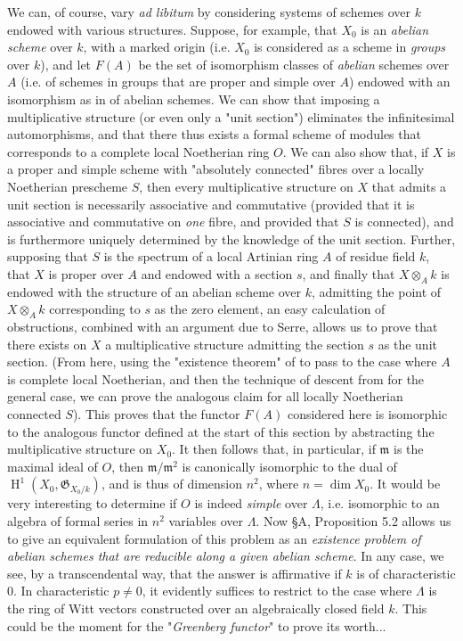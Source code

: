 We can, of course, vary  \emph{ad libitum} by considering systems of schemes over $k$ endowed with various structures.
Suppose, for example, that $X_0$ is an \emph{abelian scheme} over $k$, with a marked origin (i.e. $X_0$ is considered as a scheme in \emph{groups} over $k$), and let $F(A)$ be the set of isomorphism classes of \emph{abelian} schemes over $A$ (i.e. of schemes in groups that are proper and simple over $A$) endowed with an isomorphism as in  of abelian schemes.
We can show that imposing a multiplicative structure (or even only a "unit section") eliminates the infinitesimal automorphisms, and that there thus exists a formal scheme of modules that corresponds to a complete local Noetherian ring $O$.
We can also show that, if $X$ is a proper and simple scheme with "absolutely connected" fibres over a locally Noetherian prescheme $S$, then every multiplicative structure on $X$ that admits a unit section is necessarily associative and commutative (provided that it is associative and commutative on \emph{one} fibre, and provided that $S$ is connected), and is furthermore uniquely determined by the knowledge of the unit section.
Further, supposing that $S$ is the spectrum of a local Artinian ring $A$ of residue field $k$, that $X$ is proper over $A$ and endowed with a section $s$, and finally that $X\otimes_A k$ is endowed with the structure of an abelian scheme over $k$, admitting the point of $X\otimes_A k$ corresponding to $s$ as the zero element, an easy calculation of obstructions, combined with an argument due to Serre, allows us to prove that there exists on $X$ a multiplicative structure admitting the section $s$ as the unit section.
(From here, using the "existence theorem" of  to pass to the case where $A$ is complete local Noetherian, and then the technique of descent from  for the general case, we can prove the analogous claim for all locally Noetherian connected $S$).
This proves that the functor $F(A)$ considered here is isomorphic to the analogous functor defined at the start of this section by abstracting the multiplicative structure on $X_0$.
It then follows that, in particular, if $\mathfrak{m}$ is the maximal ideal of $O$, then $\mathfrak{m}/\mathfrak{m}^2$ is canonically isomorphic to the dual of $\operatorname{H}^1(X_0,\mathfrak{G}_{X_0/k})$, and is thus of dimension $n^2$, where $n=\dim X_0$.
It would be very interesting to determine if $O$ is indeed \emph{simple} over $\Lambda$, i.e. isomorphic to an algebra of formal series in $n^2$ variables over $\Lambda$.
Now §A, Proposition 5.2   allows us to give an equivalent formulation of this problem as an \emph{existence problem of abelian schemes that are reducible along a given abelian scheme}.
In any case, we see, by a transcendental way, that the answer is affirmative if $k$ is of characteristic $0$.
In characteristic $p\neq0$, it evidently suffices to restrict to the case where $\Lambda$ is the ring of Witt vectors constructed over an algebraically closed field $k$.
This could be the moment for the "\emph{Greenberg functor}" to prove its worth...


